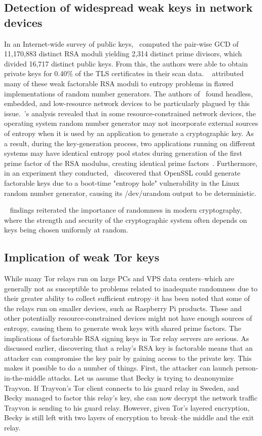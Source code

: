 \subsection{Detection of widespread weak keys in network devices}
In an Internet-wide survey of public keys,~\cite{heninger2012mining} computed the pair-wise GCD of 11,170,883 distinct RSA moduli yielding 2,314 distinct prime divisors, which divided 16,717 distinct public keys. From this, the authors were able to obtain private keys for 0.40\% of the TLS certificates in their scan data. ~\cite{heninger2012mining} attributed many of these weak factorable RSA moduli to entropy problems in flawed implementations of random number generators. The authors of~\cite{heninger2012mining} found headless, embedded, and low-resource network devices to be particularly plagued by this issue.~\cite{heninger2012mining}'s analysis revealed that in some resource-constrained network devices, the operating system random number generator may not incorporate external sources of entropy when it is used by an application to generate a cryptographic key. As a result, during the key-generation process, two applications running on different systems may have identical entropy pool states during generation of the first prime factor of the RSA modulus, creating identical prime factors~\cite{hastings2016weak}. Furthermore, in an experiment they conducted,~\cite{heninger2012mining} discovered that OpenSSL could generate factorable keys due to a boot-time "entropy hole" vulnerability in the Linux random number generator, causing its /dev/urandom output to be deterministic. 

~\cite{heninger2012mining} findings reiterated the importance of randomness in modern cryptography, where the strength and security of the cryptographic system often depends on keys being chosen uniformly at random.

\subsection{Implication of weak Tor keys}
While many Tor relays run on large PCs and VPS data centers--which are generally not as susceptible to problems related to inadequate randomness due to their greater ability to collect sufficient entropy--it has been noted that some of the relays run on smaller devices, such as Raspberry Pi products. These and other potentially resource-constrained devices might not have enough sources of entropy, causing them to generate weak keys with shared prime factors. The implications of factorable RSA signing keys in Tor relay servers are serious. As discussed earlier, discovering that a relay's RSA key is factorable means that an attacker can compromise the key pair by gaining access to the private key. This makes it possible to do a number of things. First, the attacker can launch person-in-the-middle attacks. Let us assume that Becky is trying to deanonymize Trayvon. If Trayvon's Tor client connects to his guard relay in Sweden,
and Becky managed to factor this relay's key, she can now decrypt the network traffic Trayvon is sending to his guard relay. However, given Tor's layered encryption, Becky is still left with two layers of encryption to break--the middle and the exit relay.

